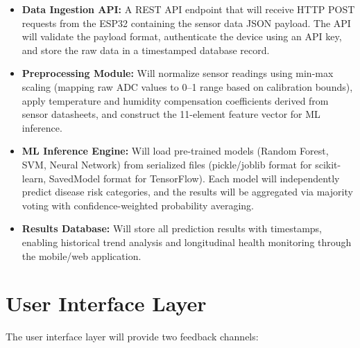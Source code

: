 \begin{itemize}[leftmargin=1.5cm]
\item \textbf{Data Ingestion API:} A REST API endpoint that will receive HTTP POST requests from the ESP32 containing the sensor data JSON payload. The API will validate the payload format, authenticate the device using an API key, and store the raw data in a timestamped database record.

\item \textbf{Preprocessing Module:} Will normalize sensor readings using min-max scaling (mapping raw ADC values to 0--1 range based on calibration bounds), apply temperature and humidity compensation coefficients derived from sensor datasheets, and construct the 11-element feature vector for ML inference.

\item \textbf{ML Inference Engine:} Will load pre-trained models (Random Forest, SVM, Neural Network) from serialized files (pickle/joblib format for scikit-learn, SavedModel format for TensorFlow). Each model will independently predict disease risk categories, and the results will be aggregated via majority voting with confidence-weighted probability averaging.

\item \textbf{Results Database:} Will store all prediction results with timestamps, enabling historical trend analysis and longitudinal health monitoring through the mobile/web application.
\end{itemize}

\section{User Interface Layer}
The user interface layer will provide two feedback channels:

